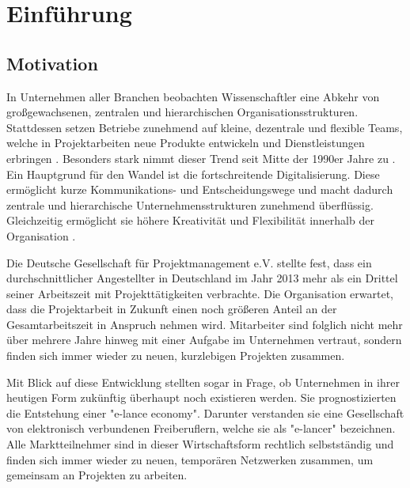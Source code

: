 \chapter{Einführung}
\label{ch:intro}

\section{Motivation}
\label{sec:intro:motivation}
In Unternehmen aller Branchen beobachten Wissenschaftler eine Abkehr von großgewachsenen, zentralen und hierarchischen Organisationsstrukturen. Stattdessen setzen Betriebe zunehmend auf kleine, dezentrale und flexible Teams, welche in Projektarbeiten neue Produkte entwickeln und Dienstleistungen erbringen \cite[S. 3]{elanceEconomy:1999}. Besonders stark nimmt dieser Trend seit Mitte der 1990er Jahre zu \cite[S. 8]{whittington:1999}. Ein Hauptgrund für den Wandel ist die fortschreitende Digitalisierung. Diese ermöglicht kurze Kommunikations- und Entscheidungswege und macht dadurch zentrale und hierarchische Unternehmensstrukturen zunehmend überflüssig. Gleichzeitig ermöglicht sie höhere Kreativität und Flexibilität innerhalb der Organisation \cite[S. 5]{elanceEconomy:1999}.

Die Deutsche Gesellschaft für Projektmanagement e.V. \cite[S. 16]{gpm:2015} stellte fest, dass ein durchschnittlicher Angestellter in Deutschland im Jahr 2013 mehr als ein Drittel seiner Arbeitszeit mit Projekttätigkeiten verbrachte. Die Organisation erwartet, dass die Projektarbeit in Zukunft einen noch größeren Anteil an der Gesamtarbeitszeit in Anspruch nehmen wird. Mitarbeiter sind folglich nicht mehr über mehrere Jahre hinweg mit einer Aufgabe im Unternehmen vertraut, sondern finden sich immer wieder zu neuen, kurzlebigen Projekten zusammen.

Mit Blick auf diese Entwicklung stellten \textcite[S. 2ff.]{elanceEconomy:1999} sogar in Frage, ob Unternehmen in ihrer heutigen Form zukünftig überhaupt noch existieren werden. Sie prognostizierten die Entstehung einer "e-lance economy". Darunter verstanden sie eine Gesellschaft von elektronisch verbundenen Freiberuflern, welche sie als "e-lancer" bezeichnen. Alle Marktteilnehmer sind in dieser Wirtschaftsform rechtlich selbstständig und finden sich immer wieder zu neuen, temporären Netzwerken zusammen, um gemeinsam an Projekten zu arbeiten.

